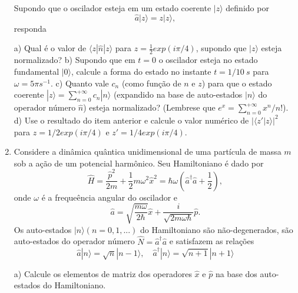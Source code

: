 \begin{enumerate}[start=1,label={\bfseries Q\arabic*.}]
Supondo que o oscilador esteja em um estado coerente $| z \rangle$ definido por
$$
\hat{a} | z \rangle = z | z \rangle,
$$
responda

  a) Qual é o valor de $\langle z | \hat{n} | z \rangle$ para $z = \frac{1}{2} exp(i\pi/4)$, supondo que $|z\rangle$ esteja normalizado?
  b) Supondo que em $t = 0$ o oscilador esteja no estado fundamental $|0\rangle$, calcule a forma do estado no instante $t = 1/10 \ s$ para $\omega = 5 \pi s^{-1} $.
  c) Quanto vale $c_{n}$ (como função de $n$ e $z$) para que o estado coerente $|z\rangle = \sum_{n=0}^{+\infty} c_{n} |n \rangle$ (expandido na base de auto-estados $|n\rangle$ do operador número $\hat{n}$) esteja normalizado? (Lembrese que $ e^{x} = \sum_{n=0}^{+\infty} x^{n}/n!$).
  d) Use o resultado do item anterior e calcule o valor numérico de $|\langle z'|z \rangle |^{2}$ para $z = 1/2 exp (i\pi / 4)$ e $z' = 1/4 exp (i\pi / 4)$.




\item Considere a dinâmica quântica unidimensional de uma partícula de massa $m$ sob a ação de um potencial harmônico. Seu Hamiltoniano é dado por
$$
\hat{H} = \frac{\hat{p}^{2}}{2m} + \frac{1}{2} m\omega^{2} \hat{x}^{2} = \hbar \omega \left(  \hat{a}^{\dagger} \hat{a} + \frac{1}{2}  \right),
$$
onde $\omega$ é a frequeência angular do oscilador e
$$
\hat{a} = \sqrt{\frac{m\omega}{2 \hbar}} \hat{x} + \frac{i}{\sqrt{2m\omega \hbar}} \hat{p}.
$$
Os auto-estados $|n\rangle (n = 0,1,...)$ do Hamiltoniano são não-degenerados, são auto-estados do operador número $\hat{N} = \hat{a}^{\dagger} \hat{a}$ e satisfazem as relações
$$
 \hat{a} | n \rangle = \sqrt{n} | n - 1 \rangle, \quad   \hat{a}^{\dagger} | n \rangle = \sqrt{n+1} | n + 1 \rangle
$$

a) Calcule os elementos de matriz dos operadores $\hat{x}$ e $\hat{p}$ na base dos auto-estados do Hamiltoniano.


\end{enumerate}
